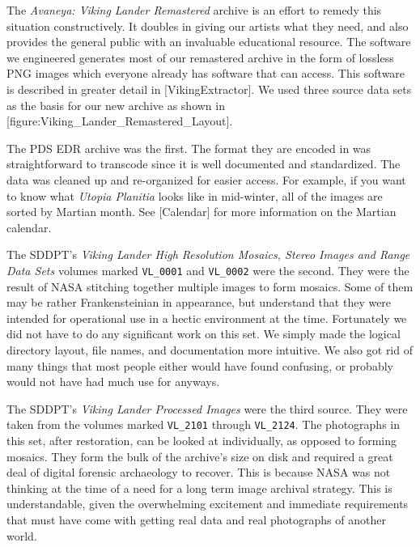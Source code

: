 The {\it Avaneya: Viking Lander Remastered} archive is an effort to remedy this situation constructively. It doubles in giving our artists what they need, and also provides the general public with an invaluable educational resource. The software we engineered generates most of our remastered archive in the form of lossless PNG images which everyone already has software that can access. This software is described in greater detail in [VikingExtractor]. We used three source data sets as the basis for our new archive as shown in [figure:Viking_Lander_Remastered_Layout].
\crlf

    {}

The PDS EDR archive was the first. The format they are encoded in was straightforward to transcode since it is well documented and standardized. The data was cleaned up and re-organized for easier access. For example, if you want to know what {\it Utopia Planitia} looks like in mid-winter, all of the images are sorted by Martian month. See [Calendar] for more information on the Martian calendar.

The SDDPT's {\it Viking Lander High Resolution Mosaics, Stereo Images and Range Data Sets} volumes marked {\tt VL_0001} and {\tt VL_0002} were the second. They were the result of NASA stitching together multiple images to form mosaics. Some of them may be rather Frankensteinian in appearance, but understand that they were intended for operational use in a hectic environment at the time. Fortunately we did not have to do any significant work on this set. We simply made the logical directory layout, file names, and documentation more intuitive. We also got rid of many things that most people either would have found confusing, or probably would not have had much use for anyways.

The SDDPT's {\it Viking Lander Processed Images} were the third source. They were taken from the volumes marked {\tt VL_2101} through {\tt VL_2124}. The photographs in this set, after restoration, can be looked at individually, as opposed to forming mosaics. They form the bulk of the archive's size on disk and required a great deal of digital forensic archaeology to recover. This is because NASA was not thinking at the time of a need for a long term image archival strategy. This is understandable, given the overwhelming excitement and immediate requirements that must have come with getting real data and real photographs of another world.

